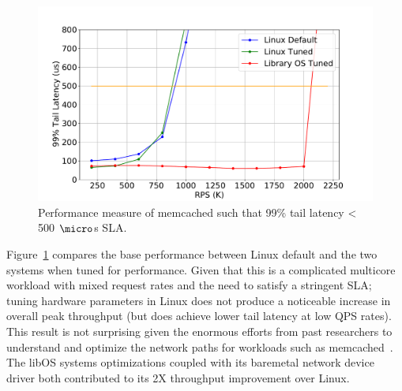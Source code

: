 \begin{figure}[t]
	\includegraphics[width=\columnwidth]{asplos2021_figures/mcd_sla.pdf}
	\caption{Performance measure of memcached such that 99\% tail latency < 500 $\micro$s SLA.}
	\label{fig:mcd_sla_tot}
\end{figure}

Figure~\ref{fig:mcd_sla_tot} compares the base performance between Linux default and the two systems when tuned for performance. Given that this is a complicated multicore workload with mixed request rates and the need to satisfy a stringent SLA; tuning hardware parameters in Linux does not produce a noticeable increase in overall peak throughput (but does achieve lower tail latency at low QPS rates). This result is not surprising given the enormous efforts from past researchers to understand and optimize the network paths for workloads such as memcached~\cite{tailatscale, scalingmcdfacebook, workloadanalysisfacebook, ix, ebbrt, farm, 222583}.  The libOS systems optimizations coupled with its baremetal network device driver both contributed to its 2X throughput improvement over Linux.

